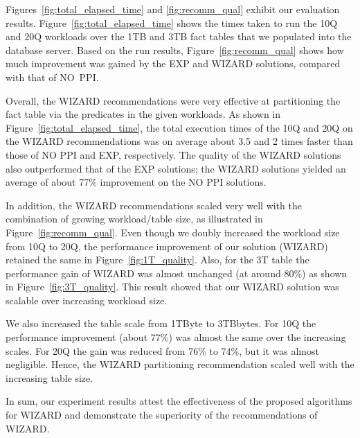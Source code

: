 \documentclass[runningheads]{comsis2}
\begin{document}
Figures~\ref{fig:total_elapsed_time} and \ref{fig:recomm_qual} exhibit our evaluation results.
Figure~\ref{fig:total_elapsed_time} shows the times taken 
to run the 10Q and 20Q workloads over the 1TB and 3TB fact tables that we populated 
into the database server.
Based on the run results, Figure~\ref{fig:recomm_qual} shows 
how much improvement was gained by the EXP and WIZARD solutions, compared with that of NO~PPI. 

Overall, the WIZARD recommendations were very effective at partitioning 
the fact table via the predicates in the given workloads. 
As shown in Figure~\ref{fig:total_elapsed_time}, the 
total execution times of the 10Q and 20Q on the WIZARD recommendations was 
on average about 3.5 and 2 times faster than those of NO PPI and EXP, respectively. 
The quality of the \hbox{WIZARD} solutions also outperformed that of the EXP solutions; 
the WIZARD solutions yielded an average of about 77\% improvement on the NO PPI solutions.

In addition, the WIZARD recommendations 
scaled very well with the combination of growing workload/table size, 
as illustrated in Figure~\ref{fig:recomm_qual}. 
Even though we doubly increased the workload size from 10Q to 20Q, 
the performance improvement of our solution (\hbox{WIZARD}) retained the same in Figure~\ref{fig:1T_quality}. 
Also, for the 3T table the performance gain of WIZARD was almost unchanged (at around 80\%) as shown in Figure~\ref{fig:3T_quality}. 
This result showed that our WIZARD \hbox{solution} was scalable over increasing workload size.

We also increased the table scale from 1TByte to 3TBbytes. 
For 10Q the performance improvement (about 77\%) was almost the same over the increasing scales.
For 20Q the gain was reduced from 76\% to 74\%, but it was almost negligible.
Hence, the WIZARD partitioning \hbox{recommendation} scaled well with the increasing table size.

In sum, our experiment results attest the effectiveness of the proposed algorithms for WIZARD 
and demonstrate the superiority of the recommendations of WIZARD.

\end{document}
